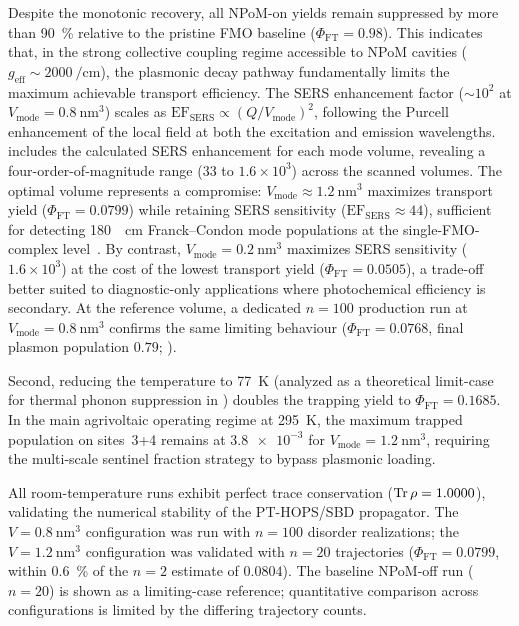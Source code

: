 \documentclass[preprint,12pt]{elsarticle}
\begin{document}
Despite the monotonic recovery, all NPoM-on yields remain suppressed by more than \qty{90}{\percent} relative to the pristine FMO baseline ($\Phi_{\mathrm{FT}} = 0.98$).
This indicates that, in the strong collective coupling regime accessible to NPoM cavities ($g_{\mathrm{eff}} \sim \qty{2000}{\per\cm}$), the plasmonic decay pathway fundamentally limits the maximum achievable transport efficiency.
The SERS enhancement factor ($\sim 10^2$ at $V_{\mathrm{mode}} = \qty{0.8}{\nm\cubed}$) scales as $\mathrm{EF}_{\mathrm{SERS}} \propto (Q/V_{\mathrm{mode}})^2$, following the Purcell enhancement of the local field at both the excitation and emission wavelengths.
 includes the calculated SERS enhancement for each mode volume, revealing a four-order-of-magnitude range ($33$ to $1.6\times10^3$) across the scanned volumes. The optimal volume represents a compromise: $V_{\mathrm{mode}} \approx \qty{1.2}{\nm\cubed}$ maximizes transport yield ($\Phi_{\mathrm{FT}} = 0.0799$) while retaining SERS sensitivity ($\mathrm{EF}_{\mathrm{SERS}} \approx 44$), sufficient for detecting \qty{180}{\per\cm} Franck--Condon mode populations at the single-FMO-complex level~\cite{CiallaMay2024}.
By contrast, $V_{\mathrm{mode}} = \qty{0.2}{\nm\cubed}$ maximizes SERS sensitivity ($1.6\times10^3$) at the cost of the lowest transport yield ($\Phi_{\mathrm{FT}} = 0.0505$), a trade-off better suited to diagnostic-only applications where photochemical efficiency is secondary. At the reference volume, a dedicated $n=100$ production run at $V_{\mathrm{mode}} = \qty{0.8}{\nm\cubed}$ confirms the same limiting behaviour ($\Phi_{\mathrm{FT}} = 0.0768$, final plasmon population $0.79$; ).

Second, reducing the temperature to \qty{77}{\kelvin} (analyzed as a theoretical limit-case for thermal phonon suppression in ) doubles the trapping yield to $\Phi_{\mathrm{FT}} = 0.1685$. In the main agrivoltaic operating regime at \qty{295}{\kelvin}, the maximum trapped population on sites~3+4 remains at $\num{3.8e-3}$ for $V_{\mathrm{mode}} = \qty{1.2}{\nm\cubed}$, requiring the multi-scale sentinel fraction strategy to bypass plasmonic loading.

All room-temperature runs exhibit perfect trace conservation ($\Tr\rho = \num{1.0000 \pm 0.0000}$), validating the numerical stability of the PT-HOPS/SBD propagator. The $V=\qty{0.8}{\nm\cubed}$ configuration was run with $n=100$ disorder realizations; the $V=\qty{1.2}{\nm\cubed}$ configuration was validated with $n=20$ trajectories ($\Phi_{\mathrm{FT}} = 0.0799$, within \qty{0.6}{\percent} of the $n=2$ estimate of $0.0804$). The baseline NPoM-off run ($n=20$) is shown as a limiting-case reference; quantitative comparison across configurations is limited by the differing trajectory counts.
\end{document}
